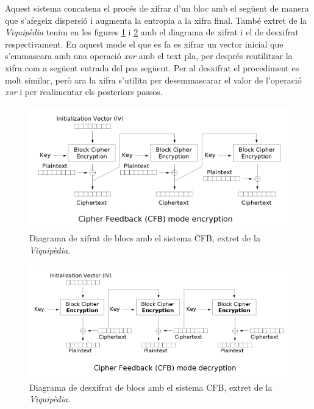\documentclass[12pt,twoside,catalan,a4paper]{book}%
\numberwithin{figure}{section}		%
\theoremstyle{definition}   			%
\theoremstyle{saltolinea}   			%
\begin{document}
Aquest sistema concatena el proc\'es de xifrar d'un bloc amb el seg\"uent de manera que s'afegeix dispersi\'o i augmenta la entropia a la xifra final. Tamb\'e extret de la \emph{Viquip\`edia} tenim en les figures \ref{fig:Cfb_encryption} i \ref{fig:Cfb_decryption} amb el diagrama de xifrat i el de desxifrat respectivament. En aquest mode el que es fa es xifrar un vector inicial que s'emmascara amb una operaci\'o \emph{xor} amb el text pla, per despr\'es reutilitzar la xifra com a seg\"uent entrada del pas seg\"uent. Per al desxifrat el procediment es molt similar, per\`o ara la xifra s'utilita per desemmascarar el valor de l'operaci\'o \emph{xor} i per realimentar els posteriors passos.

\begin{figure}[ht]
\centering
\includegraphics[width=1\textwidth]{imatges/Cfb_encryption.png}
\caption{Diagrama de xifrat de blocs amb el sistema CFB, extret de la \emph{Viquip\`edia}.\label{fig:Cfb_encryption}}
\end{figure}

\begin{figure}[ht]
\centering
\includegraphics[width=1\textwidth]{imatges/Cfb_decryption.png}
\caption{Diagrama de desxifrat de blocs amb el sistema CFB, extret de la \emph{Viquip\`edia}.\label{fig:Cfb_decryption}}
\end{figure}
\end{document}
